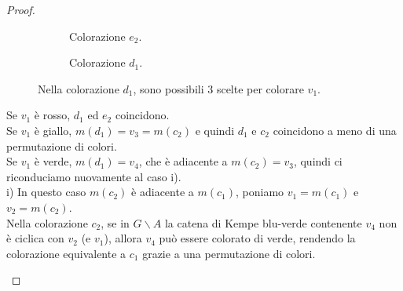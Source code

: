 \documentclass[a4paper,12pt,titlepage]{report}
\begin{document}
\begin{proof}
\begin{figure}[H]
\begin{subfigure}{0.3\textwidth}
    			\caption{Colorazione $e_2$.}
    		\end{subfigure}
    		\begin{subfigure}{0.3\textwidth}
    			\centering
    			\caption{Colorazione $d_1$.}
    		\end{subfigure}
    		\vspace{0.5cm}
    		\caption{Nella colorazione $d_1$, sono possibili 3 scelte per colorare $v_1$.}
    	\end{figure}
    	\noindent Se $v_1$ è rosso, $d_1$ ed $e_2$ coincidono.
    	\\Se $v_1$ è giallo, $m(d_1) = v_3 = m(c_2)$ e quindi $d_1$ e $c_2$ coincidono a meno di una permutazione di colori.
    	\\Se $v_1$ è verde, $m(d_1) = v_4$, che è adiacente a $m(c_2) = v_3$, quindi ci riconduciamo nuovamente al caso i).
    	\vspace{0.3cm}
    	\\i) In questo caso $m(c_2)$ è adiacente a $m(c_1)$, poniamo $v_1 = m(c_1)$ e $v_2 = m(c_2)$.
    	\\Nella colorazione $c_2$, se in $G \smallsetminus A$ la catena di Kempe blu-verde contenente $v_4$ non è ciclica con $v_2$ (e $v_1$), allora $v_4$ può essere colorato di verde, rendendo la colorazione equivalente a $c_1$ grazie a una permutazione di colori.
    	\begin{figure}[H]
    		\centering
    		\begin{subfigure}{0.3\textwidth}
    			\centering
\end{subfigure}
\end{figure}
\end{proof}
\end{document}
